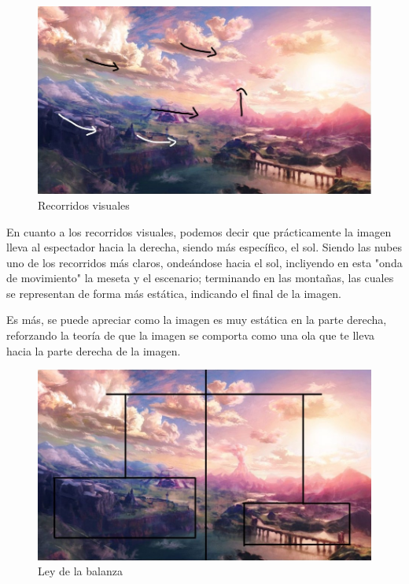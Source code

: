 \documentclass[12pt]{article}
\begin{document}
         \newpage
          \begin{figure}[H]
            \centering
            \includegraphics[scale = 0.4]{images/Jesus/Seccion2/Group 2.JPEG}
            \caption{Recorridos visuales}
          \end{figure}
          En cuanto a los recorridos visuales, podemos decir que prácticamente la imagen lleva al espectador hacia la derecha, siendo más específico, el sol. 
          Siendo las nubes uno de los recorridos más claros, ondeándose hacia el sol, incliyendo en esta "onda de movimiento" la meseta y el escenario; terminando en las montañas, las cuales se representan de forma más estática, indicando el final de la imagen. 

          Es más, se puede apreciar como la imagen es muy estática en la parte derecha, reforzando la teoría de que la imagen se comporta como una ola que te lleva hacia la parte derecha de la imagen.
          \newpage

          \begin{figure}[H]
            \centering
            \includegraphics[scale = 0.4]{Jesus/Seccion2/Group 6.JPEG}
            \caption{Ley de la balanza}
          \end{figure}
          
\end{document}

